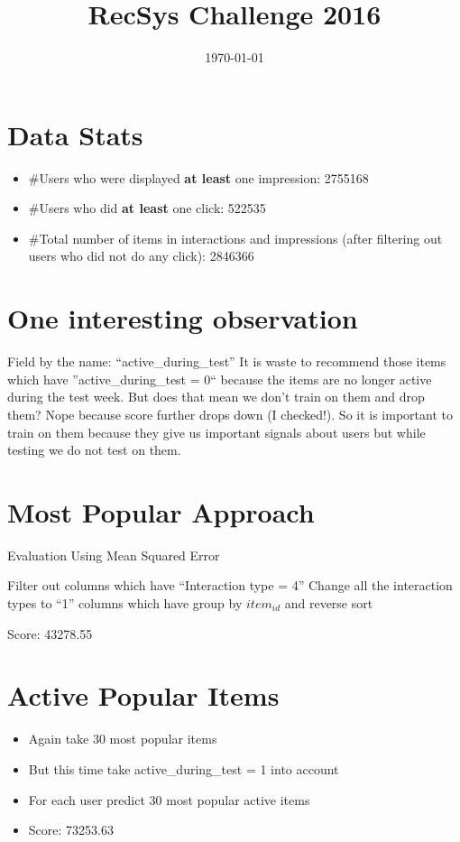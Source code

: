 \documentclass{article}
\begin{document}
\title{RecSys Challenge 2016}
\date{\today}
\maketitle
\section{Data Stats}
\begin{itemize}
 \item \#Users who were displayed \textbf{at least} one impression: 2755168
 \item \#Users who did \textbf{at least} one click: 522535
 \item \#Total number of items in interactions and impressions (after filtering out users who did not do any click): 2846366
\end{itemize}

\section{One interesting observation}
Field by the name: ``active\_during\_test''
It is waste to recommend those items which have ''active\_during\_test = 0`` because the items are no longer active during the test week. But does that mean we don't train on them and drop 
them? Nope because score further drops down (I checked!). So it is important to train on them because they give us important signals about users but while testing we do not test on them.
\section{Most Popular Approach}

\begin{algorithm}
\caption{Evaluation Using Mean Squared Error}
\begin{algorithmic}[1] 
\State Filter out columns which have ``Interaction type = 4''
\State Change all the interaction types to ``1'' columns which have
\State group by $item_{id}$ and reverse sort
\end{algorithmic}
\end{algorithm}
Score: 43278.55

\section{Active Popular Items}
\begin{itemize}
 \item Again take 30 most popular items
 \item But this time take active\_during\_test = 1 into account
 \item For each user predict 30 most popular active items
 \item Score: 73253.63 	
\end{itemize}
\end{document}
